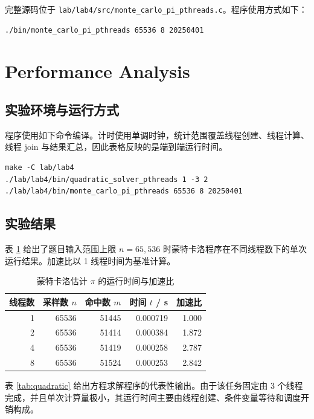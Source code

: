 \documentclass[UTF8,a4paper,12pt,fontset=none]{ctexart}
\begin{document}
完整源码位于 \texttt{lab/lab4/src/monte\_carlo\_pi\_pthreads.c}。程序使用方式如下：
\begin{lstlisting}[style=cstyle]
./bin/monte_carlo_pi_pthreads 65536 8 20250401
\end{lstlisting}

\section{Performance Analysis}

\subsection{实验环境与运行方式}

程序使用如下命令编译。计时使用单调时钟，统计范围覆盖线程创建、线程计算、线程 join 与结果汇总，因此表格反映的是端到端运行时间。

\begin{lstlisting}[style=cstyle]
make -C lab/lab4
./lab/lab4/bin/quadratic_solver_pthreads 1 -3 2
./lab/lab4/bin/monte_carlo_pi_pthreads 65536 8 20250401
\end{lstlisting}

\subsection{实验结果}

表 \ref{tab:mc} 给出了题目输入范围上限 \(n=65,536\) 时蒙特卡洛程序在不同线程数下的单次运行结果。加速比以 1 线程时间为基准计算。

\begin{table}[H]
  \centering
  \caption{蒙特卡洛估计 \(\pi\) 的运行时间与加速比}
  \label{tab:mc}
  \renewcommand{\arraystretch}{1.18}
  \begin{tabular}{rrrrr}
    \toprule
    线程数 & 采样数 \(n\) & 命中数 \(m\) & 时间 \(t\) / s & 加速比 \\
    \midrule
    1 & 65536 & 51445 & 0.000719 & 1.000 \\
    2 & 65536 & 51414 & 0.000384 & 1.872 \\
    4 & 65536 & 51419 & 0.000258 & 2.787 \\
    8 & 65536 & 51524 & 0.000253 & 2.842 \\
    \bottomrule
  \end{tabular}
\end{table}

表 \ref{tab:quadratic} 给出方程求解程序的代表性输出。由于该任务固定由 3 个线程完成，并且单次计算量极小，其运行时间主要由线程创建、条件变量等待和调度开销构成。
\end{document}
